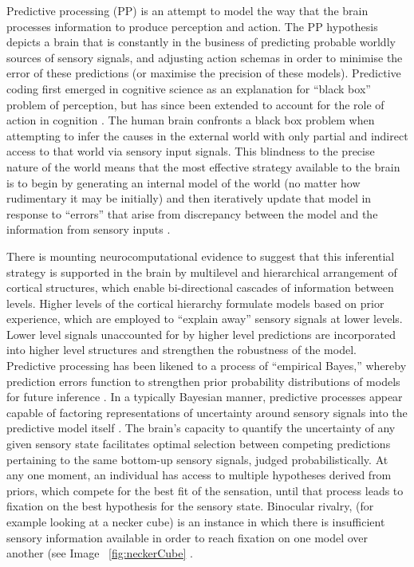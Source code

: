 \begin{CJK}{UTF8}{gbsn}
{
Predictive processing (PP) is an attempt to model the way that the brain processes information to produce perception and action. The PP hypothesis depicts a brain that is constantly in the business of predicting probable worldly sources of sensory signals, and adjusting action schemas in order to minimise the error of these predictions (or maximise the precision of these models). Predictive coding first emerged in cognitive science as an explanation for ``black box'' problem of perception, but has since been extended to account for the role of action in cognition \citep{Friston2010}.
The human brain confronts a black box problem when attempting to infer the causes in the external world with only partial and indirect access to that world via sensory input signals. This blindness to the precise nature of the world means that the most effective strategy available to the brain is to begin by generating an internal model of the world (no matter how rudimentary it may be initially) and then iteratively update that model in response to ``errors'' that arise from discrepancy between the model and the information from sensory inputs \citep{Frith2007}.

There is mounting neurocomputational evidence to suggest that this inferential strategy is supported in the brain by multilevel and hierarchical arrangement of cortical structures, which enable bi-directional cascades of information between levels.  Higher levels of the cortical hierarchy formulate models based on prior experience, which are employed to ``explain away'' sensory signals at lower levels. Lower level signals unaccounted for by higher level predictions are incorporated into higher level structures and strengthen the robustness of the model.  Predictive processing has been likened to a process of ``empirical Bayes,'' whereby prediction errors function to strengthen prior probability distributions of models for future inference \citep{Robbins1964}.  In a typically Bayesian manner, predictive processes appear capable of factoring representations of uncertainty around sensory signals into the predictive model itself \citep{Clark2013}.  The brain's capacity to quantify the uncertainty of any given sensory state facilitates optimal selection between competing predictions pertaining to the same bottom-up sensory signals, judged probabilistically.  At any one moment, an individual has access to multiple hypotheses derived from priors, which compete for the best fit of the sensation, until that process leads to fixation on the best hypothesis for the sensory state.
Binocular rivalry, (for example looking at a necker cube) is an instance in which there is insufficient sensory information available in order to reach fixation on one model over another (see Image ~\ref{fig:neckerCube} \citep{Frith2007}.

}
\end{CJK}
